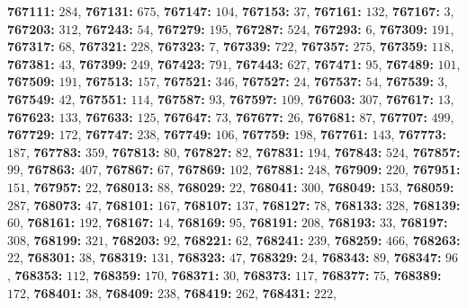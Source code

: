 \textsf{\bfseries 767111:} $284$, \textsf{\bfseries 767131:} $675$, \textsf{\bfseries 767147:} $104$, \textsf{\bfseries 767153:} $37$, \textsf{\bfseries 767161:} $132$, \textsf{\bfseries 767167:} $3$, \textsf{\bfseries 767203:} $312$, \textsf{\bfseries 767243:} $54$, \textsf{\bfseries 767279:} $195$, \textsf{\bfseries 767287:} $524$, \textsf{\bfseries 767293:} $6$, \textsf{\bfseries 767309:} $191$, \textsf{\bfseries 767317:} $68$, \textsf{\bfseries 767321:} $228$, \textsf{\bfseries 767323:} $7$, \textsf{\bfseries 767339:} $722$, \textsf{\bfseries 767357:} $275$, \textsf{\bfseries 767359:} $118$, \textsf{\bfseries 767381:} $43$, \textsf{\bfseries 767399:} $249$, \textsf{\bfseries 767423:} $791$, \textsf{\bfseries 767443:} $627$, \textsf{\bfseries 767471:} $95$, \textsf{\bfseries 767489:} $101$, \textsf{\bfseries 767509:} $191$, \textsf{\bfseries 767513:} $157$, \textsf{\bfseries 767521:} $346$, \textsf{\bfseries 767527:} $24$, \textsf{\bfseries 767537:} $54$, \textsf{\bfseries 767539:} $3$, \textsf{\bfseries 767549:} $42$, \textsf{\bfseries 767551:} $114$, \textsf{\bfseries 767587:} $93$, \textsf{\bfseries 767597:} $109$, \textsf{\bfseries 767603:} $307$, \textsf{\bfseries 767617:} $13$, \textsf{\bfseries 767623:} $133$, \textsf{\bfseries 767633:} $125$, \textsf{\bfseries 767647:} $73$, \textsf{\bfseries 767677:} $26$, \textsf{\bfseries 767681:} $87$, \textsf{\bfseries 767707:} $499$, \textsf{\bfseries 767729:} $172$, \textsf{\bfseries 767747:} $238$, \textsf{\bfseries 767749:} $106$, \textsf{\bfseries 767759:} $198$, \textsf{\bfseries 767761:} $143$, \textsf{\bfseries 767773:} $187$, \textsf{\bfseries 767783:} $359$, \textsf{\bfseries 767813:} $80$, \textsf{\bfseries 767827:} $82$, \textsf{\bfseries 767831:} $194$, \textsf{\bfseries 767843:} $524$, \textsf{\bfseries 767857:} $99$, \textsf{\bfseries 767863:} $407$, \textsf{\bfseries 767867:} $67$, \textsf{\bfseries 767869:} $102$, \textsf{\bfseries 767881:} $248$, \textsf{\bfseries 767909:} $220$, \textsf{\bfseries 767951:} $151$, \textsf{\bfseries 767957:} $22$, \textsf{\bfseries 768013:} $88$, \textsf{\bfseries 768029:} $22$, \textsf{\bfseries 768041:} $300$, \textsf{\bfseries 768049:} $153$, \textsf{\bfseries 768059:} $287$, \textsf{\bfseries 768073:} $47$, \textsf{\bfseries 768101:} $167$, \textsf{\bfseries 768107:} $137$, \textsf{\bfseries 768127:} $78$, \textsf{\bfseries 768133:} $328$, \textsf{\bfseries 768139:} $60$, \textsf{\bfseries 768161:} $192$, \textsf{\bfseries 768167:} $14$, \textsf{\bfseries 768169:} $95$, \textsf{\bfseries 768191:} $208$, \textsf{\bfseries 768193:} $33$, \textsf{\bfseries 768197:} $308$, \textsf{\bfseries 768199:} $321$, \textsf{\bfseries 768203:} $92$, \textsf{\bfseries 768221:} $62$, \textsf{\bfseries 768241:} $239$, \textsf{\bfseries 768259:} $466$, \textsf{\bfseries 768263:} $22$, \textsf{\bfseries 768301:} $38$, \textsf{\bfseries 768319:} $131$, \textsf{\bfseries 768323:} $47$, \textsf{\bfseries 768329:} $24$, \textsf{\bfseries 768343:} $89$, \textsf{\bfseries 768347:} $96$, \textsf{\bfseries 768353:} $112$, \textsf{\bfseries 768359:} $170$, \textsf{\bfseries 768371:} $30$, \textsf{\bfseries 768373:} $117$, \textsf{\bfseries 768377:} $75$, \textsf{\bfseries 768389:} $172$, \textsf{\bfseries 768401:} $38$, \textsf{\bfseries 768409:} $238$, \textsf{\bfseries 768419:} $262$, \textsf{\bfseries 768431:} $222$, 
